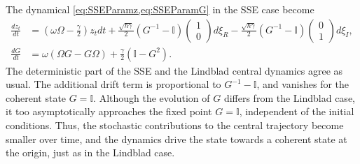 \documentclass[12pt]{iopart} %
\begin{document}
The dynamical \cref{eq:SSEParamz,eq:SSEParamG} in the SSE case become
\begin{equation} 
    \begin{aligned} \label{eq:SSEAnh}
    \frac{d  z_t}{d t} &= (\omega\Omega -\frac{\gamma}{2 }) z_t dt +\frac{\sqrt{\hbar \gamma}}{2}(G^{-1}-\mathbb{I})\begin{pmatrix}1 \\ 0\end{pmatrix}d\xi_R-\frac{\sqrt{\hbar \gamma}}{2}(G^{-1}-\mathbb{I})\begin{pmatrix}0 \\ 1\end{pmatrix}d\xi_I,\\
  	\frac{dG}{dt} &=\omega(\Omega G-G\Omega) +\frac{\gamma}{2 }( \mathbb{I} - G^2).
    \end{aligned}
\end{equation}
The deterministic part of the SSE and the Lindblad central dynamics agree as usual. The additional drift term is proportional to $G^{-1}-\mathbb{I}$, and vanishes for the coherent state $G=\mathbb{I}$. Although the evolution of $G$ differs from the Lindblad case, it too asymptotically approaches the fixed point $G=\mathbb{I}$, independent of the initial conditions. Thus, the stochastic contributions to the central trajectory become smaller over time, and the dynamics drive the state towards a coherent state at the origin, just as in the Lindblad case. 
\end{document}
